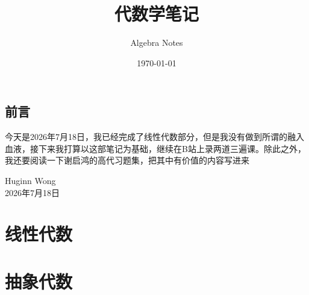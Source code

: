\documentclass[10pt]{book}
\title{代数学笔记}
\author{Algebra Notes}
\date{\today}
\newcommand{\algebrachapter}[1]{\clearpage\clearpage}
\begin{document}
\makecover

\frontmatter
	
\chapter*{前言}
今天是2026年7月18日，我已经完成了线性代数部分，但是我没有做到所谓的融入血液，接下来我打算以这部笔记为基础，继续在B站上录两道三遍课。除此之外，我还要阅读一下谢启鸿的高代习题集，把其中有价值的内容写进来

\vspace{1cm}
\begin{flushright}
	Huginn Wong\\
	2026年7月18日
\end{flushright}
	\tableofcontents
	\clearpage
	
	
	\newpage
	
	
	\mainmatter
	\setcounter{page}{1}
	
\part{线性代数}
\algebrachapter{chapters/Part 1/chapter1}
\algebrachapter{chapters/Part 1/chapter2}
\algebrachapter{chapters/Part 1/chapter3}
\algebrachapter{chapters/Part 1/chapter4}
\algebrachapter{chapters/Part 1/chapter5}
\algebrachapter{chapters/Part 1/chapter6}
\algebrachapter{chapters/Part 1/chapter7}

\part{抽象代数}
\setcounter{chapter}{0}
\algebrachapter{chapters/Part 2/chapter1}
\algebrachapter{chapters/Part 2/chapter2}
\algebrachapter{chapters/Part 2/chapter3}
	
	
	
	\backmatter
	\nocite{axler_linear_2014,lay_linear_2018,strang_introduction_2016,peng_linear_nodate,xie_advanced_2022}
	
	
	
\end{document}
